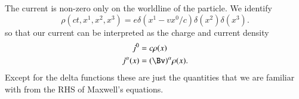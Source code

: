 %
The current is non-zero only on the worldline of the particle.  We identify
%
\begin{equation}\label{eqn:relativisticElectrodynamicsL12b:550}
\rho(ct, x^1, x^2, x^3) = e \delta(x^1 - v x^0/c) \delta(x^2) \delta(x^3).
\end{equation}
%
so that our current can be interpreted as the charge and current density
%
\begin{equation}\label{eqn:relativisticElectrodynamicsL12b:570}
\begin{aligned}
j^0 &= c \rho(x) \\
j^\alpha(x) &= (\Bv)^\alpha \rho(x).
\end{aligned}
\end{equation}
%
Except for the delta functions these are just the quantities that we are familiar with from the RHS of Maxwell's equations.
